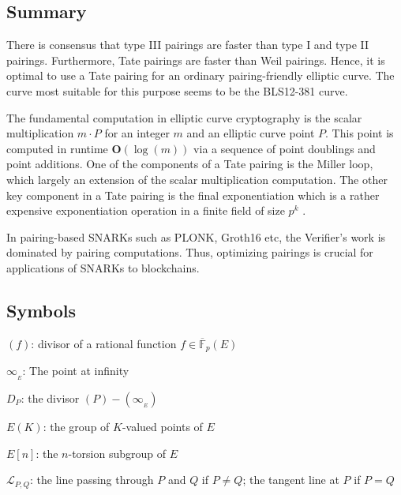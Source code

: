 \documentclass[11pt, lettersize, notitlepage, leqno, footskip=0.6cm]{article}
\newcommand{\bFP}{\ov{\mathbb{F}}_p}
\newcommand{\mc}{\mathcal}
\newcommand{\mbf}{\mathbf}
\newcommand{\ov}{\overline}
\newcommand{\bO}{\mbf{O}}
\newcommand{\noin}{\noindent}
\numberwithin{equation}{section}
\begin{document}
\subsection{\fontsize{11}{11}\selectfont Summary}

There is consensus that type III pairings are faster than type I and type II pairings. Furthermore, Tate pairings are faster than Weil pairings. Hence, it is optimal to use a Tate pairing for an ordinary pairing-friendly elliptic curve. The curve most suitable for this purpose seems to be the BLS12-381 curve.

The fundamental computation in elliptic curve cryptography is the scalar multiplication $m\cdot P$ for an integer $m$ and an elliptic curve point $P$. This point is computed in runtime $\bO(\log(m))$ via a sequence of point doublings and point additions. One of the components of a Tate pairing is the Miller loop, which largely an extension of the scalar multiplication computation. The other key component in a Tate pairing is the final exponentiation which is a rather expensive exponentiation operation in a finite field of size $p^k$ .  

In pairing-based SNARKs such as PLONK, Groth16 etc, the Verifier's work is dominated by pairing computations. Thus, optimizing pairings is crucial for applications of SNARKs to blockchains.











\subsection{\fontsize{11}{11}\selectfont Symbols}

\noin $(f)$: divisor of a rational function $f\in \bFP(E)$ \vspace{2mm}

\noin $\infty_{_E}$: The point at infinity \vspace{2mm}

\noin $D_P$: the divisor $(P)-(\infty_{_E})$ \vspace{2mm}

\noin $E(K)$: the group of $K$-valued points of $E$ \vspace{2mm}

\noin $E[n]$: the $n$-torsion subgroup of $E$ \vspace{2mm}

\noin $\mc{L}_{P,Q}$: the line passing through $P$ and $Q$ if $P\neq Q$; the tangent line at $P$ if $P = Q$ \vspace{2mm}
\end{document}
